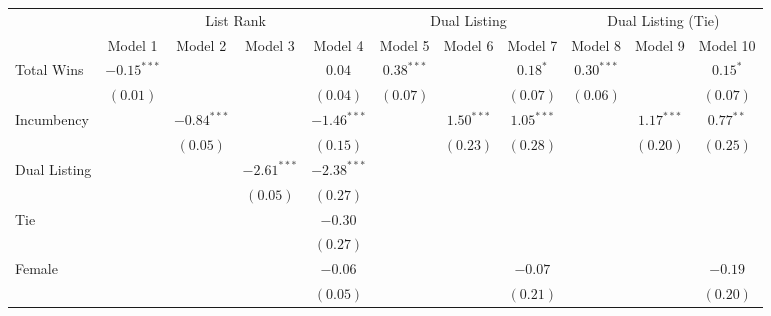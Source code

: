 
\begin{table}
\begin{center}
\begin{tabular}{l c c c c c c c c c c}
\hline
 & \multicolumn{4}{c}{List Rank} & \multicolumn{3}{c}{Dual Listing} & \multicolumn{3}{c}{Dual Listing (Tie)} \\
\cline{2-5} \cline{6-8} \cline{9-11}
 & Model 1 & Model 2 & Model 3 & Model 4 & Model 5 & Model 6 & Model 7 & Model 8 & Model 9 & Model 10 \\
\hline
Total Wins       & $-0.15^{***}$ &               &               & $0.04$        & $0.38^{***}$ &              & $0.18^{*}$   & $0.30^{***}$ &              & $0.15^{*}$  \\
                 & $(0.01)$      &               &               & $(0.04)$      & $(0.07)$     &              & $(0.07)$     & $(0.06)$     &              & $(0.07)$    \\
Incumbency       &               & $-0.84^{***}$ &               & $-1.46^{***}$ &              & $1.50^{***}$ & $1.05^{***}$ &              & $1.17^{***}$ & $0.77^{**}$ \\
                 &               & $(0.05)$      &               & $(0.15)$      &              & $(0.23)$     & $(0.28)$     &              & $(0.20)$     & $(0.25)$    \\
Dual Listing     &               &               & $-2.61^{***}$ & $-2.38^{***}$ &              &              &              &              &              &             \\
                 &               &               & $(0.05)$      & $(0.27)$      &              &              &              &              &              &             \\
Tie              &               &               &               & $-0.30$       &              &              &              &              &              &             \\
                 &               &               &               & $(0.27)$      &              &              &              &              &              &             \\
Female           &               &               &               & $-0.06$       &              &              & $-0.07$      &              &              & $-0.19$     \\
                 &               &               &               & $(0.05)$      &              &              & $(0.21)$     &              &              & $(0.20)$    \\

\end{tabular}
\end{center}
\end{table}
